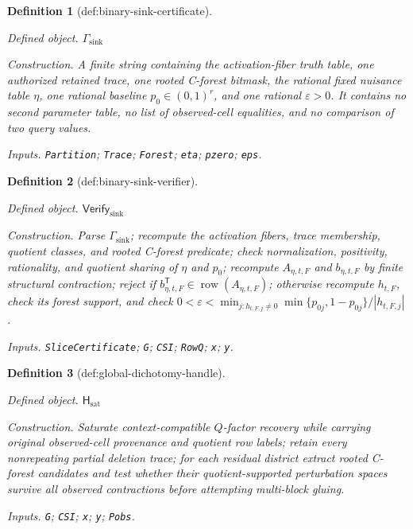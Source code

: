 \documentclass{article}
\newtheorem{definition}{Definition}
\begin{document}
\begin{definition}[def:binary-sink-certificate]\label{def:binary-sink-certificate}
\par\smallskip\noindent\emph{Defined object.} \(\Gamma_{\mathrm{sink}}\)
\par\smallskip\noindent\emph{Construction.} A finite string containing the activation-fiber truth table, one authorized retained trace, one rooted C-forest bitmask, the rational fixed nuisance table \(\eta\), one rational baseline \(p_0\in(0,1)^r\), and one rational \(\varepsilon>0\). It contains no second parameter table, no list of observed-cell equalities, and no comparison of two query values.
\par\smallskip\noindent\emph{Inputs.} \texttt{Partition}; \texttt{Trace}; \texttt{Forest}; \texttt{eta}; \texttt{pzero}; \texttt{eps}.
\end{definition}

\begin{definition}[def:binary-sink-verifier]\label{def:binary-sink-verifier}
\par\smallskip\noindent\emph{Defined object.} \(\mathsf{Verify}_{\mathrm{sink}}\)
\par\smallskip\noindent\emph{Construction.} Parse \(\Gamma_{\mathrm{sink}}\); recompute the activation fibers, trace membership, quotient classes, and rooted C-forest predicate; check normalization, positivity, rationality, and quotient sharing of \(\eta\) and \(p_0\); recompute \(A_{\eta,t,F}\) and \(b_{\eta,t,F}\) by finite structural contraction; reject if \(b_{\eta,t,F}^{\mathsf T}\in\operatorname{row}(A_{\eta,t,F})\); otherwise recompute \(h_{t,F}\), check its forest support, and check \(0<\varepsilon<\min_{j:h_{t,F,j}\ne0}\min\{p_{0j},1-p_{0j}\}/|h_{t,F,j}|\).
\par\smallskip\noindent\emph{Inputs.} \texttt{SliceCertificate}; \texttt{G}; \texttt{CSI}; \texttt{RowQ}; \texttt{x}; \texttt{y}.
\end{definition}

\begin{definition}[def:global-dichotomy-handle]\label{def:global-dichotomy-handle}
\par\smallskip\noindent\emph{Defined object.} \(\mathsf H_{\mathrm{sat}}\)
\par\smallskip\noindent\emph{Construction.} Saturate context-compatible \(Q\)-factor recovery while carrying original observed-cell provenance and quotient row labels; retain every nonrepeating partial deletion trace; for each residual district extract rooted C-forest candidates and test whether their quotient-supported perturbation spaces survive all observed contractions before attempting multi-block gluing.
\par\smallskip\noindent\emph{Inputs.} \texttt{G}; \texttt{CSI}; \texttt{x}; \texttt{y}; \texttt{Pobs}.
\end{definition}
\end{document}
